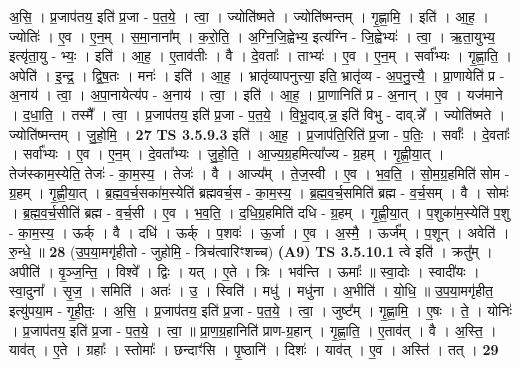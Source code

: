 \documentclass[17pt]{extarticle}
\begin{document}
                  अ॒सि॒ । प्र॒जाप॑तय॒ इति॑ प्र॒जा - प॒त॒ये॒ । त्वा॒ । ज्योति॑ष्मते । ज्योति॑ष्मन्तम् । गृ॒ह्णा॒मि॒ । इति॑ । आ॒ह॒ । ज्योतिः॑ । ए॒व । ए॒न॒म् । स॒मा॒नाना᳚म् । क॒रो॒ति॒ । अ॒ग्नि॒जि॒ह्वेभ्य॒ इत्य॑ग्नि - जि॒ह्वेभ्यः॑ । त्वा॒ । ऋ॒ता॒युभ्य॒ इत्यृ॑ता॒यु - भ्यः॒ । इति॑ । आ॒ह॒ । ए॒ताव॑तीः । वै । दे॒वताः᳚ । ताभ्यः॑ । ए॒व । ए॒न॒म् । सर्वा᳚भ्यः । गृ॒ह्णा॒ति॒ । अपेति॑ । इ॒न्द्र॒ । द्वि॒ष॒तः । मनः॑ । इति॑ । आ॒ह॒ । भ्रातृ॑व्यापनुत्त्या॒ इति॒ भ्रातृ॑व्य - अ॒प॒नु॒त्त्यै॒ । प्रा॒णायेति॑ प्र - अ॒नाय॑ । त्वा॒ । अ॒पा॒नायेत्य॑प - अ॒नाय॑ । त्वा॒ । इति॑ । आ॒ह॒ । प्रा॒णानिति॑ प्र - अ॒नान् । ए॒व । यज॑माने । द॒धा॒ति॒ । तस्मै᳚ । त्वा॒ । प्र॒जाप॑तय॒ इति॑ प्र॒जा - प॒त॒ये॒ । वि॒भू॒दाव्.न्न॒ इति॑ विभु - दाव्.न्ने᳚ । ज्योति॑ष्मते । ज्योति॑ष्मन्तम् । जु॒हो॒मि॒ । \textbf{  27} \newline
                  \newline
                                \textbf{ TS 3.5.9.3} \newline
                  इति॑ । आ॒ह॒ । प्र॒जाप॑ति॒रिति॑ प्र॒जा - प॒तिः॒ । सर्वाः᳚ । दे॒वताः᳚ । सर्वा᳚भ्यः । ए॒व । ए॒न॒म् । दे॒वता᳚भ्यः । जु॒हो॒ति॒ । आ॒ज्य॒ग्र॒हमित्या᳚ज्य - ग्र॒हम् । गृ॒ह्णी॒या॒त् । तेज॑स्काम॒स्येति॒ तेजः॑ - का॒म॒स्य॒ । तेजः॑ । वै । आज्य᳚म् । ते॒ज॒स्वी । ए॒व । भ॒व॒ति॒ । सो॒म॒ग्र॒हमिति॑ सोम - ग्र॒हम् । गृ॒ह्णी॒या॒त् । ब्र॒ह्म॒व॒र्च॒सका॑म॒स्येति॑ ब्रह्मवर्च॒स - का॒म॒स्य॒ । ब्र॒ह्म॒व॒र्च॒समिति॑ ब्रह्म - व॒र्च॒सम् । वै । सोमः॑ । ब्र॒ह्म॒व॒र्च॒सीति॑ ब्रह्म - व॒र्च॒सी । ए॒व । भ॒व॒ति॒ । द॒धि॒ग्र॒हमिति॑ दधि - ग्र॒हम् । गृ॒ह्णी॒या॒त् । प॒शुका॑म॒स्येति॑ प॒शु - का॒म॒स्य॒ । ऊर्क् । वै । दधि॑ । ऊर्क् । प॒शवः॑ । ऊ॒र्जा । ए॒व । अ॒स्मै॒ । ऊर्ज᳚म् । प॒शून् । अवेति॑ । रु॒न्धे॒ ॥ \textbf{  28} \newline
                  \newline
                      (उ॒प॒या॒मगृ॑हीतो - जुहोमि॒ - त्रिच॑त्वारिꣳशच्च)  \textbf{(A9)} \newline \newline
                                \textbf{ TS 3.5.10.1} \newline
                  त्वे इति॑ । क्रतु᳚म् । अपीति॑ । वृ॒ञ्ज॒न्ति॒ । विश्वे᳚ । द्विः । यत् । ए॒ते । त्रिः । भव॑न्ति । ऊमाः᳚ ॥ स्वा॒दोः । स्वादी॑यः । स्वा॒दुना᳚ । सृ॒ज॒ । समिति॑ । अतः॑ । उ॒ । स्विति॑ । मधु॑ । मधु॑ना । अ॒भीति॑ । यो॒धि॒ ॥ उ॒प॒या॒मगृ॑हीत॒ इत्यु॑पया॒म - गृ॒ही॒तः॒ । अ॒सि॒ । प्र॒जाप॑तय॒ इति॑ प्र॒जा - प॒त॒ये॒ । त्वा॒ । जुष्ट᳚म् । गृ॒ह्णा॒मि॒ । ए॒षः । ते॒ । योनिः॑ । प्र॒जाप॑तय॒ इति॑ प्र॒जा - प॒त॒ये॒ । त्वा॒ ॥ प्रा॒ण॒ग्र॒हानिति॑ प्राण-ग्र॒हान् । गृ॒ह्णा॒ति॒ । ए॒ताव॑त् । वै । अ॒स्ति॒ । याव॑त् । ए॒ते । ग्रहाः᳚ । स्तोमाः᳚ । छन्दाꣳ॑सि । पृ॒ष्ठानि॑ । दिशः॑ । याव॑त् । ए॒व । अस्ति॑ । तत् । \textbf{  29} \newline
\end{document}
